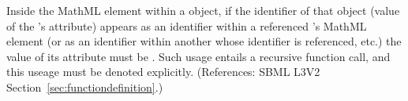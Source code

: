 Inside the  MathML element within a \FunctionDefinition
object, if the identifier of that object (\ie value of the
\FunctionDefinition's  attribute) appears as an identifier within a referenced \FunctionDefinition's  MathML element (or as an identifier within another \FunctionDefinition whose identifier is referenced, etc.) the value of its  attribute must be .  Such usage entails a recursive function call, and this useage must be denoted explicitly.  (References: SBML L3V2
Section~\ref{sec:functiondefinition}.)
